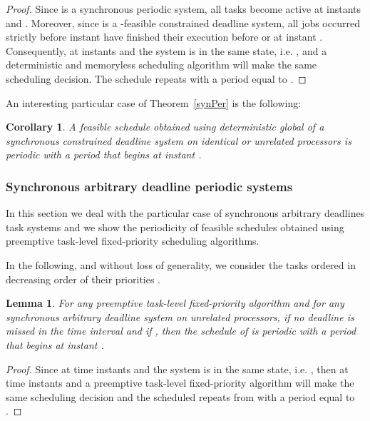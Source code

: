 \documentclass[a4paper,11pt]{article}
\newtheorem{Lemma}[Theorem]{Lemma}
\newtheorem{Corollary}[Theorem]{Corollary}
\begin{document}
\begin{proof} 
  Since  is a synchronous periodic system, all tasks become
  active at instants  and . Moreover, since  is a
  -feasible constrained deadline system, all jobs occurred strictly
  before instant  have finished their execution before or at
  instant . Consequently, at instants  and  the system is in
  the same state, i.e. , and a deterministic and
  memoryless scheduling algorithm will make the same scheduling
  decision. The schedule repeats with a period equal to .
\end{proof}

An interesting particular case of Theorem~\ref{synPer} is the following:

\begin{Corollary}\label{edfAll2} 
  A feasible schedule obtained using deterministic global {} of a
  synchronous constrained deadline system  on  identical or
  unrelated processors is periodic with a period  that begins at
  instant . 
\end{Corollary}


\subsubsection{Synchronous arbitrary deadline periodic
  systems} \label{synSectarb}

In this section we deal with the particular case of synchronous
arbitrary deadlines task systems and we show the periodicity of
feasible schedules obtained using preemptive task-level fixed-priority
scheduling algorithms.

In the following, and without loss of generality, we consider the tasks
ordered in decreasing order of their priorities .

\begin{Lemma}\label{synPerLem} For any preemptive task-level fixed-priority
  algorithm  and for any synchronous arbitrary deadline system 
  on  unrelated processors, if no deadline is missed in the time interval
   and if , then the schedule of  is periodic with a period  that begins at instant .
\end{Lemma}

\begin{proof}
  Since at time instants  and  the system is in the same state,
  i.e. , then at time instants  and  a
  preemptive task-level fixed-priority algorithm will make the same scheduling
  decision and the scheduled repeats from  with a period equal to
  .
\end{proof}
\end{document}
